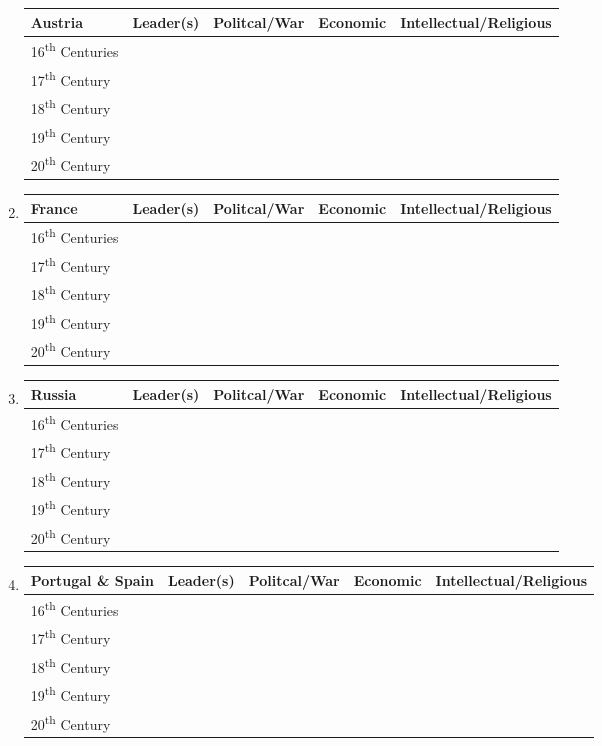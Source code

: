 \documentclass[12pt]{article}
\begin{document}
\begin{enumerate}
\begin{tabular}{l c c c c}
Austria & Leader(s) & Politcal/War & Economic & Intellectual/Religious \\
\hline
16\textsuperscript{th} Centuries & & & & \\
\hline
17\textsuperscript{th} Century & & & & \\
\hline
18\textsuperscript{th} Century & & & & \\
\hline
19\textsuperscript{th} Century & & & & \\
\hline
20\textsuperscript{th} Century & & & & \\

\end{tabular}

\item \begin{tabular}{l c c c c}

France & Leader(s) & Politcal/War & Economic & Intellectual/Religious \\
\hline
16\textsuperscript{th} Centuries & & & & \\
\hline
17\textsuperscript{th} Century & & & & \\
\hline
18\textsuperscript{th} Century & & & & \\
\hline
19\textsuperscript{th} Century & & & & \\
\hline
20\textsuperscript{th} Century & & & & \\

\end{tabular}

\item \begin{tabular}{l c c c c}

Russia & Leader(s) & Politcal/War & Economic & Intellectual/Religious \\
\hline
16\textsuperscript{th} Centuries & & & & \\
\hline
17\textsuperscript{th} Century & & & & \\
\hline
18\textsuperscript{th} Century & & & & \\
\hline
19\textsuperscript{th} Century & & & & \\
\hline
20\textsuperscript{th} Century & & & & \\

\end{tabular}

\item \begin{tabular}{l c c c c}

Portugal \& Spain & Leader(s) & Politcal/War & Economic & Intellectual/Religious \\
\hline
16\textsuperscript{th} Centuries & & & & \\
\hline
17\textsuperscript{th} Century & & & & \\
\hline
18\textsuperscript{th} Century & & & & \\
\hline
19\textsuperscript{th} Century & & & & \\
\hline
20\textsuperscript{th} Century & & & & \\


\end{tabular}
\end{enumerate}
\end{document}
